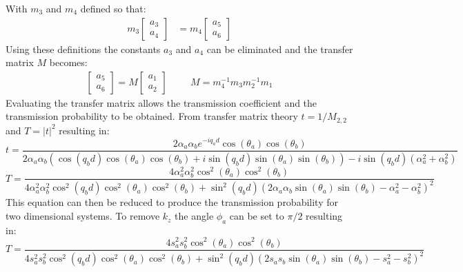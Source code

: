 		With $m_{3}$ and $m_{4}$ defined so that:
		\begin{align}
			m_{3}\left[\begin{array}{ccc}
				a_{3}\\
				a_{4}
			\end{array}\right]
			&=
			m_{4}\left[\begin{array}{ccc}
				a_{5}\\
				a_{6}
			\end{array}\right]
		\end{align}
		Using these definitions the constants $a_{3}$ and $a_{4}$ can be eliminated and the transfer matrix $M$ becomes:
		\begin{align}
			\left[\begin{array}{ccc}
				a_{5}\\
				a_{6}
			\end{array}\right]=M
			\left[\begin{array}{ccc}
				a_{1}\\
				a_{2}
			\end{array}\right]\hspace{1cm}
			M=m_{4}^{-1}m_{3}m_{2}^{-1}m_{1}
		\end{align}
		Evaluating the transfer matrix allows the transmission coefficient and the transmission probability to be obtained. From transfer matrix theory $t=1/M_{2,2}$ and $T=|t|^{2}$ resulting in:
		\begin{equation}
			t=\frac{2\alpha_{a}\alpha_{b}e^{-iq_{a}d}\cos(\theta_{a})\cos(\theta_{b})}{2\alpha_{a}\alpha_{b}\left(\cos(q_{b}d)\cos(\theta_{a})\cos(\theta_{b})+i\sin(q_{b}d)\sin(\theta_{a})\sin(\theta_{b})\right)-i\sin(q_{b}d)\left(\alpha_{a}^{2}+\alpha_{b}^{2}\right)}
		\end{equation}
		\begin{equation}
			T=\frac{4\alpha_{a}^{2}\alpha_{b}^{2}\cos^{2}(\theta_{a})\cos^{2}(\theta_{b})}{4\alpha_{a}^{2}\alpha_{b}^{2}\cos^{2}(q_{b}d)\cos^{2}(\theta_{a})\cos^{2}(\theta_{b})+\sin^{2}(q_{b}d)\left(2\alpha_{a}\alpha_{b}\sin(\theta_{a})\sin(\theta_{b})-\alpha_{a}^{2}-\alpha_{b}^{2}\right)^{2}}
		\label{weyl-combo-t}
		\end{equation}
		This equation can then be reduced to produce the transmission probability for two dimensional systems. To remove $k_{z}$ the angle $\phi_{a}$ can be set to $\pi /2$ resulting in:
		\begin{equation}
			T=\frac{4s_{a}^{2}s_{b}^{2}\cos^{2}(\theta_{a})\cos^{2}(\theta_{b})}{4s_{a}^{2}s_{b}^{2}\cos^{2}(q_{b}d)\cos^{2}(\theta_{a})\cos^{2}(\theta_{b})+\sin^{2}(q_{b}d)\left(2s_{a}s_{b}\sin(\theta_{a})\sin(\theta_{b})-s_{a}^{2}-s_{b}^{2}\right)^{2}}
		\end{equation}
